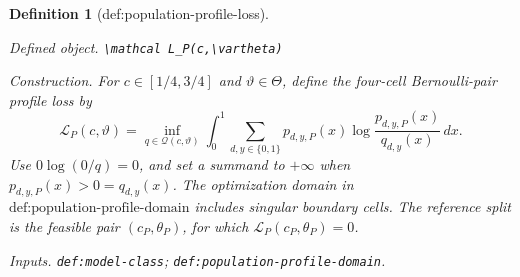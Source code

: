 \documentclass{article}
\newtheorem{definition}{Definition}
\begin{document}
\begin{definition}[def:population-profile-loss]\label{def:population-profile-loss}
\par\smallskip\noindent\emph{Defined object.} \texttt{\textbackslash{}\allowbreak{}mathcal L\_\allowbreak{}P(c,\allowbreak{}\textbackslash{}\allowbreak{}vartheta)}
\par\smallskip\noindent\emph{Construction.} For \(c\in[1/4,3/4]\) and \(\vartheta\in\Theta\), define the four-cell Bernoulli-pair profile loss by \[\mathcal L_P(c,\vartheta)=\inf_{q\in\mathcal Q(c,\vartheta)}\int_0^1\sum_{d,y\in\{0,1\}}p_{d,y,P}(x)\log\frac{p_{d,y,P}(x)}{q_{d,y}(x)}\,dx.\] Use \(0\log(0/q)=0\), and set a summand to \(+\infty\) when \(p_{d,y,P}(x)>0=q_{d,y}(x)\). The optimization domain in \(\text{def:population-profile-domain}\) includes singular boundary cells. The reference split is the feasible pair \((c_P,\theta_P)\), for which \(\mathcal L_P(c_P,\theta_P)=0\).
\par\smallskip\noindent\emph{Inputs.} \texttt{def:\allowbreak{}model-\allowbreak{}class}; \texttt{def:\allowbreak{}population-\allowbreak{}profile-\allowbreak{}domain}.
\end{definition}
\end{document}
